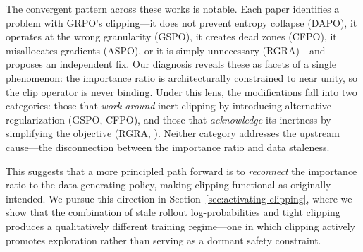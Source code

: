 The convergent pattern across these works is notable.
Each paper identifies a problem with GRPO's clipping---it does not prevent entropy collapse (DAPO), it operates at the wrong granularity (GSPO), it creates dead zones (CFPO), it misallocates gradients (ASPO), or it is simply unnecessary (RGRA)---and proposes an independent fix.
Our diagnosis reveals these as facets of a single phenomenon: the importance ratio is architecturally constrained to near unity, so the clip operator is never binding.
Under this lens, the modifications fall into two categories: those that \emph{work around} inert clipping by introducing alternative regularization (GSPO, CFPO), and those that \emph{acknowledge} its inertness by simplifying the objective (RGRA, \citealt{chen2025iclr}).
Neither category addresses the upstream cause---the disconnection between the importance ratio and data staleness.

This suggests that a more principled path forward is to \emph{reconnect} the importance ratio to the data-generating policy, making clipping functional as originally intended.
We pursue this direction in Section~\ref{sec:activating-clipping}, where we show that the combination of stale rollout log-probabilities and tight clipping produces a qualitatively different training regime---one in which clipping actively promotes exploration rather than serving as a dormant safety constraint.
